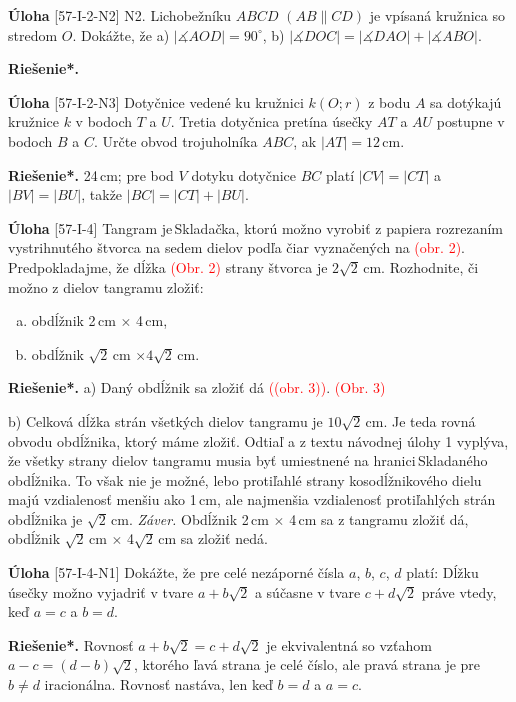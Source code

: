 \documentclass{article}
\newcommand{\rieh}{\textbf{Riešenie*.} }
\newcommand{\ma}{\measuredangle}
\newcommand\todo[1]{\noindent\textcolor{red}{(#1)}}
\newcommand{\problem}[4]{
  \begin{tcolorbox}[breakable,notitle,boxrule=0pt,colback=light-gray,colframe=light-gray]
    \textbf{Úloha}
    [#1] #3
  \end{tcolorbox}
  \noindent#4
}
\begin{document}
\problem{57-I-2-N2}{}{
N2. Lichobežníku $ABCD$ $(AB \parallel CD)$ je vpísaná kružnica so stredom $O$. Dokážte, že
a) $|\ma AOD| = 90^\circ$, b) $|\ma DOC| = |\ma DAO| + |\ma ABO|$.
}{
\rieh
}


\problem{57-I-2-N3}{}{
Dotyčnice vedené ku kružnici $k(O; r)$ z bodu $A$ sa dotýkajú kružnice $k$ v bodoch $T$
a $U$. Tretia dotyčnica pretína úsečky $AT$ a $AU$ postupne v bodoch $B$ a $C$. Určte obvod
trojuholníka $ABC$, ak $|AT| = 12$\,cm.
}{
\rieh 24\,cm; pre bod $V$ dotyku dotyčnice $BC$ platí $|CV|=|CT|$ a $|BV| =|BU|$, takže $|BC| =|CT| +|BU|$.
}


\problem{57-I-4}{}{
Tangram je\,Skladačka, ktorú možno vyrobiť z papiera rozrezaním vystrihnutého
štvorca na sedem dielov podľa čiar vyznačených na \todo{obr. 2}. Predpokladajme, že dĺžka
\todo{Obr. 2}
strany štvorca je $2\sqrt{2}$\,cm. Rozhodnite, či možno z dielov tangramu zložiť:
\begin{enumerate}[a)]
    \item obdĺžnik 2\,cm $\times$ 4\,cm,
    \item obdĺžnik $\sqrt{2}$\,cm $\times 4 \sqrt{2}$\,cm.
\end{enumerate}
}{
\rieh a) Daný obdĺžnik sa zložiť dá \todo{(obr. 3)}.
\todo{Obr. 3}

b) Celková dĺžka \uv{iracionálnych} strán všetkých dielov tangramu je $10\sqrt{2}$\,cm. Je
teda rovná obvodu obdĺžnika, ktorý máme zložiť. Odtiaľ a z textu návodnej úlohy 1 vyplýva, že všetky \uv{iracionálne} strany dielov tangramu musia byť umiestnené na hranici\,Skladaného obdĺžnika. To však nie je možné, lebo protiľahlé
\uv{iracionálne} strany kosodĺžnikového dielu majú vzdialenosť menšiu ako 1\,cm, ale najmenšia vzdialenosť protiľahlých strán obdĺžnika je $\sqrt{2}$\,cm.
\textit{Záver.} Obdĺžnik 2\,cm $\times$ 4\,cm sa z tangramu zložiť dá, obdĺžnik $\sqrt{2}$\,cm $\times$ 4$\sqrt{2}$\,cm sa zložiť nedá.
}


\problem{57-I-4-N1}{}{
Dokážte, že pre celé nezáporné čísla $a$, $b$, $c$, $d$ platí: Dĺžku úsečky možno vyjadriť
v tvare $a + b\sqrt{2}$ a súčasne v tvare $c + d\sqrt{2}$ práve vtedy, keď $a = c$ a $b = d$.
}{
\rieh Rovnosť $a + b \sqrt{2}= c + d\sqrt{2}$ je ekvivalentná so vzťahom $a-c = (d-b)\sqrt{2}$, ktorého ľavá strana je celé číslo, ale pravá strana je pre $b \neq d$ iracionálna. Rovnosť nastáva, len keď $b = d$ a $a = c$.
}
\end{document}
